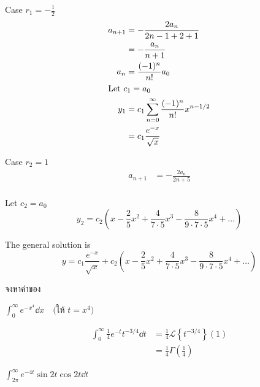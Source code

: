 \documentclass[12pt,final]{novelette} %
\begin{document}
\begin{question}
    Case $r_1 = -\frac12$
    \begin{align*}
        a_{n+1} & = - \frac{2 a_n}{2n - 1 + 2 + 1}                    \\
                & = - \frac{a_n}{n + 1}                               \\
        a_n     & = \frac{(-1)^n}{n!} a_0                             \\
        \intertext{Let $c_1 = a_0$}
        y_1     & = c_1 \sum_{n=0}^\infty \frac{(-1)^n}{n!} x^{n-1/2} \\
                & = c_1 \frac{e^{-x}}{\sqrt{x}}
    \end{align*}

    Case $r_2 = 1$
    \begin{align*}
        a_{n+1} & = - \frac{2 a_n}{2n + 5} \\
    \end{align*}

    \vspace{-2em}
    Let $c_2 = a_0$
    \vspace{1em}
    $$
        y_2 = c_2 \left(x - \frac25 x^2 + \frac{4}{7\cdot5} x^3 - \frac{8}{9\cdot7\cdot5} x^4 + \dots\right)
    $$

    \medskip

    The general solution is
    $$
        \boxed{y = c_1 \frac{e^{-x}}{\sqrt{x}} + c_2 \left(x - \frac25 x^2 + \frac{4}{7\cdot5} x^3 - \frac{8}{9\cdot7\cdot5} x^4 + \dots\right)}
    $$

    \item {}
    จงหาค่าของ
    \begin{question}
        \item
        $\displaystyle \int_0^\infty e^{-x^4} \dd{x} \quad \text{(ให้ $t = x^4$)}$ 

        \begin{align*}
            \int_0^\infty \frac14 e^{-t} t^{-3/4} \dd{t} & = \frac14 \mathcal{L}\left\{t^{-3/4}\right\}(1) \\
                                                         & = \boxed{\frac14 \Gamma\left(\frac14\right)}
        \end{align*}

        \pagebreak

        \item
        $\displaystyle \int_{2\pi}^\infty e^{-4t} \sin 2t \cos 2t \dd{t}$ 


\end{question}
\end{question}
\end{document}
